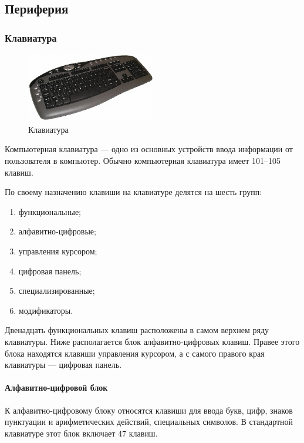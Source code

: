 \subsection{Периферия}\label{base:introduction:components:peripheral}
\subsubsection{Клавиатура}\label{base:introduction:components:peripheral:keyboard}
\begin{figure}
 \centering
 \includegraphics[width=0.5\textwidth]{base/Introduction/Keyboard.jpg}
 \caption{Клавиатура}\label{base:introduction:components:peripheral:keyboardpic}
\end{figure}
Компьютерная клавиатура --- одно из основных устройств ввода информации от пользователя в компьютер.
Обычно компьютерная клавиатура имеет 101--105 клавиш.

По своему назначению клавиши на клавиатуре делятся на шесть групп:
\begin{enumerate}
 \item функциональные;
 \item алфавитно-цифровые;
 \item управления курсором;
 \item цифровая панель;
 \item специализированные;
 \item модификаторы.
\end{enumerate}

Двенадцать функциональных клавиш расположены в самом верхнем ряду клавиатуры.
Ниже располагается блок алфавитно-цифровых клавиш.
Правее этого блока находятся клавиши управления курсором, а с самого правого края клавиатуры --- цифровая панель.

\paragraph{Алфавитно-цифровой блок}
К алфавитно-цифровому блоку относятся клавиши для ввода букв, цифр, знаков пунктуации и арифметических действий, специальных символов.
В стандартной клавиатуре этот блок включает 47 клавиш.

